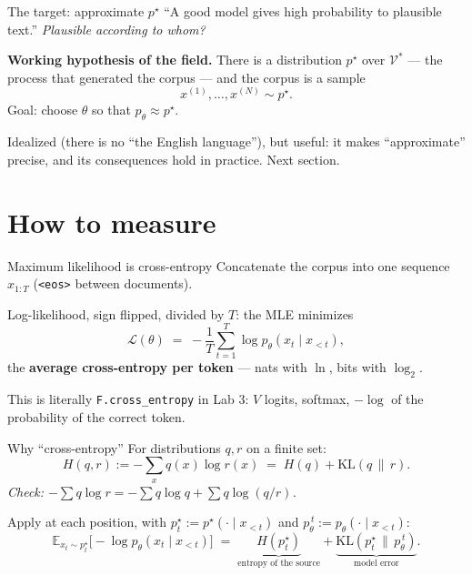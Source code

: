 \documentclass[11pt,aspectratio=169]{beamer}
\newcommand{\V}{\mathcal{V}}
\newcommand{\Lc}{\mathcal{L}}
\newcommand{\KL}{\mathrm{KL}}
\newcommand{\pstar}{p^{\star}}
\newcommand{\ptheta}{p_{\theta}}
\newcommand{\E}{\mathbb{E}}
\newcommand{\dest}[1]{\textcolor{structure}{\textbf{#1}}}
\newcommand{\hook}[1]{{\small\textcolor{gray!60!black}{\textit{#1}}}}
\newcommand{\eos}{\texttt{<eos>}}
\begin{document}
\begin{frame}{The target: approximate $\pstar$}
  ``A good model gives high probability to plausible text.'' \emph{Plausible according to
  whom?}

  \vspace{0.8em}
  \textbf{Working hypothesis of the field.} There is a distribution $\pstar$ over $\V^{*}$
  --- the process that generated the corpus --- and the corpus is a sample
  \[
    x^{(1)},\dots,x^{(N)} \sim \pstar .
  \]
  Goal: choose $\theta$ so that $\ptheta\approx\pstar$.

  \vspace{0.8em}
  Idealized (there is no ``the English language''), but useful: it makes ``approximate''
  precise, and its consequences hold in practice. Next section.
\end{frame}

\section{How to measure}

\begin{frame}{Maximum likelihood is cross-entropy}
  Concatenate the corpus into one sequence $x_{1:T}$ (\eos{} between documents).

  \vspace{0.4em}
  Log-likelihood, sign flipped, divided by $T$: the MLE minimizes
  \[
    \Lc(\theta) \;=\; -\frac{1}{T}\sum_{t=1}^{T}\log\ptheta(x_t\mid x_{<t}),
  \]
  the \dest{average cross-entropy per token} --- nats with $\ln$, bits with $\log_2$.

  \vspace{0.8em}
  This is literally \texttt{F.cross\_entropy} in Lab 3: $V$ logits, softmax, $-\log$ of the
  probability of the correct token.
\end{frame}

\begin{frame}{Why ``cross-entropy''}
  For distributions $q, r$ on a finite set:
  \[
    H(q, r) := -\sum_x q(x)\log r(x) \;=\; H(q) + \KL(q\,\|\,r).
  \]
  \hook{Check: $-\sum q\log r = -\sum q\log q + \sum q\log(q/r)$.}

  \vspace{0.8em}
  Apply at each position, with $\pstar_t := \pstar(\cdot\mid x_{<t})$ and
  $\ptheta^{\,t} := \ptheta(\cdot\mid x_{<t})$:
  \[
    \E_{x_t\sim\pstar_t}\big[-\log\ptheta(x_t\mid x_{<t})\big]
    \;=\; \underbrace{H(\pstar_t)}_{\text{entropy of the source}}
       + \underbrace{\KL(\pstar_t\,\|\,\ptheta^{\,t})}_{\text{model error}} .
  \]
\end{frame}
\end{document}
